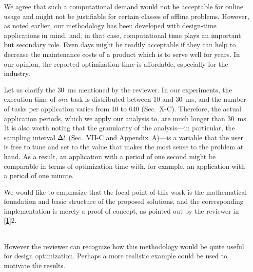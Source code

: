 \begin{authors}
We agree that such a computational demand would not be acceptable for online
usage and might not be justifiable for certain classes of offline problems.
However, as noted earlier, our methodology has been developed with design-time
applications in mind, and, in that case, computational time plays an important
but secondary role. Even days might be readily acceptable if they can help to
decrease the maintenance costs of a product which is to serve well for years.
In our opinion, the reported optimization time is affordable, especially for
the industry.

Let us clarify the 30~ms mentioned by the reviewer. In our experiments, the
execution time of \emph{one} task is distributed between 10 and 30~ms, and the
number of tasks per application varies from 40 to 640 (Sec.~X-C). Therefore,
the actual application periods, which we apply our analysis to, are much longer
than 30~ms. It is also worth noting that the granularity of the analysis---in
particular, the sampling interval $\Delta t$ (Sec.~VII-C and Appendix~A)---is a
variable that the user is free to tune and set to the value that makes the most
sense to the problem at hand. As a result, an application with a period of one
second might be comparable in terms of optimization time with, for example, an
application with a period of one minute.

We would like to emphasize that the focal point of this work is the
mathematical foundation and basic structure of the proposed solutions, and the
corresponding implementation is merely a proof of concept, as pointed out by
the reviewer in \cref{1}{2}.

\begin{actions}
\end{actions}
\end{authors}

\begin{reviewer}
\\
However the reviewer can recognize how this methodology would be quite useful
for design optimization. Perhaps a more realistic example could be used to
motivate the results.
\end{reviewer}


